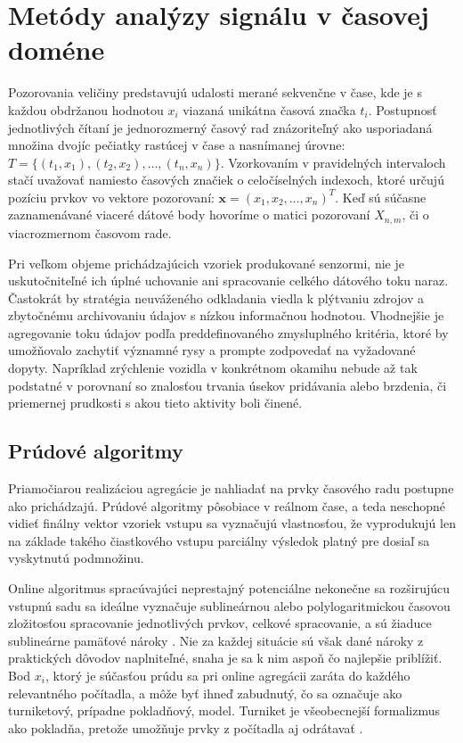 \section{Metódy analýzy signálu v časovej doméne}
Pozorovania veličiny predstavujú udalosti merané sekvenčne v čase, kde je s každou obdržanou hodnotou $x_i$ viazaná unikátna 
časová značka $t_i$. Postupnosť jednotlivých čítaní je jednorozmerný časový rad znázoriteľný ako usporiadaná množina dvojíc pečiatky 
rastúcej v čase a nasnímanej úrovne: $T = \{(t_1, x_1),(t_2, x_2), …, (t_n, x_n)\}$. Vzorkovaním v pravidelných intervaloch stačí 
uvažovať namiesto časových značiek o celočíselných indexoch, ktoré určujú pozíciu prvkov vo vektore pozorovaní: 
$\mathbf{x} = (x_1, x_2, …, x_n)^T$. Keď sú súčasne zaznamenávané viaceré dátové body hovoríme o matici pozorovaní $X_{n,m}$, či o 
viacrozmernom časovom rade.

Pri veľkom objeme prichádzajúcich vzoriek produkované senzormi, nie je uskutočniteľné ich úplné uchovanie ani spracovanie celkého 
dátového toku naraz. Častokrát by stratégia neuváženého odkladania viedla k plýtvaniu zdrojov a zbytočnému archivovaniu údajov s nízkou 
informačnou hodnotou. Vhodnejšie je agregovanie toku údajov podľa preddefinovaného zmysluplného kritéria, ktoré by umožňovalo zachytiť 
významné rysy a prompte zodpovedať na vyžadované dopyty. Napríklad zrýchlenie vozidla v konkrétnom okamihu nebude až tak podstatné v 
porovnaní so znalosťou trvania úsekov pridávania alebo brzdenia, či priemernej prudkosti s akou tieto aktivity boli činené. 

\subsection{Prúdové algoritmy}
Priamočiarou realizáciou agregácie je nahliadať na prvky časového radu postupne ako prichádzajú. 
Prúdové algoritmy pôsobiace v reálnom čase, a teda neschopné vidieť finálny vektor vzoriek vstupu sa vyznačujú vlastnosťou, že 
vyprodukujú len na základe takého čiastkového vstupu parciálny výsledok platný pre dosiaľ sa vyskytnutú podmnožinu. 

Online algoritmus  spracúvajúci neprestajný potenciálne nekonečne sa rozširujúcu vstupnú sadu sa ideálne vyznačuje sublineárnou alebo 
polylogaritmickou časovou zložitosťou spracovanie jednotlivých prvkov, celkové spracovanie, a sú žiaduce sublineárne pamäťové nároky 
\cite{data-streams}. Nie za každej situácie sú však dané nároky z praktických dôvodov naplniteľné, snaha je sa k nim aspoň čo najlepšie 
priblížiť. Bod $x_i$, ktorý je súčasťou prúdu sa pri online agregácii zaráta do každého relevantného počítadla, a môže byť ihneď 
zabudnutý, čo sa označuje ako turniketový, prípadne pokladňový, model. Turniket je všeobecnejší formalizmus ako pokladňa, pretože 
umožňuje prvky z počítadla aj odrátavať \cite{data-streams}.


